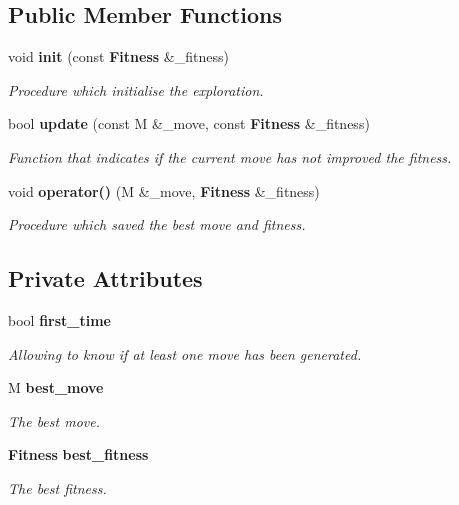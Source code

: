 \subsection*{Public Member Functions}
\begin{CompactItemize}
\item 
void {\bf init} (const {\bf Fitness} \&\_\-fitness)
\begin{CompactList}\small\item\em Procedure which initialise the exploration. \item\end{CompactList}\item 
bool {\bf update} (const M \&\_\-move, const {\bf Fitness} \&\_\-fitness)
\begin{CompactList}\small\item\em Function that indicates if the current move has not improved the fitness. \item\end{CompactList}\item 
void {\bf operator()} (M \&\_\-move, {\bf Fitness} \&\_\-fitness)
\begin{CompactList}\small\item\em Procedure which saved the best move and fitness. \item\end{CompactList}\end{CompactItemize}
\subsection*{Private Attributes}
\begin{CompactItemize}
\item 
bool {\bf first\_\-time}\label{classmo_best_impr_select_r0}

\begin{CompactList}\small\item\em Allowing to know if at least one move has been generated. \item\end{CompactList}\item 
M {\bf best\_\-move}\label{classmo_best_impr_select_r1}

\begin{CompactList}\small\item\em The best move. \item\end{CompactList}\item 
{\bf Fitness} {\bf best\_\-fitness}\label{classmo_best_impr_select_r2}

\begin{CompactList}\small\item\em The best fitness. \item\end{CompactList}\end{CompactItemize}


